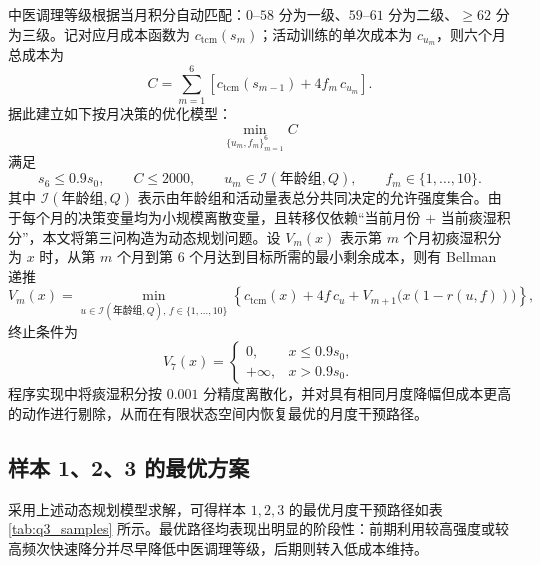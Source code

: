 \documentclass{MathorCupmodeling}
\begin{document}
		中医调理等级根据当月积分自动匹配：$0$--$58$ 分为一级、$59$--$61$ 分为二级、$\ge 62$ 分为三级。记对应月成本函数为 $c_{\text{tcm}}(s_m)$；活动训练的单次成本为 $c_{u_m}$，则六个月总成本为
		\begin{equation}
			C=\sum_{m=1}^{6}\left[c_{\text{tcm}}(s_{m-1})+4f_m\,c_{u_m}\right].
		\end{equation}
		据此建立如下按月决策的优化模型：
		\begin{equation}
			\min_{\{u_m,f_m\}_{m=1}^{6}} C
		\end{equation}
		满足
		\begin{equation}
			s_6\le 0.9s_0,\qquad C\le 2000,\qquad u_m\in\mathcal{I}(\text{年龄组},Q),\qquad f_m\in\{1,\dots,10\}.
		\end{equation}
		其中 $\mathcal{I}(\text{年龄组},Q)$ 表示由年龄组和活动量表总分共同决定的允许强度集合。由于每个月的决策变量均为小规模离散变量，且转移仅依赖“当前月份 + 当前痰湿积分”，本文将第三问构造为动态规划问题。设 $V_m(x)$ 表示第 $m$ 个月初痰湿积分为 $x$ 时，从第 $m$ 个月到第 $6$ 个月达到目标所需的最小剩余成本，则有 Bellman 递推
		\begin{equation}
			V_m(x)=\min_{u\in\mathcal{I}(\text{年龄组},Q),\,f\in\{1,\dots,10\}}
			\left\{
			c_{\text{tcm}}(x)+4f\,c_u+V_{m+1}\bigl(x(1-r(u,f))\bigr)
			\right\},
		\end{equation}
		终止条件为
		\begin{equation}
			V_7(x)=
			\begin{cases}
				0, & x\le 0.9s_0,\\
				+\infty, & x>0.9s_0.
			\end{cases}
		\end{equation}
		程序实现中将痰湿积分按 $0.001$ 分精度离散化，并对具有相同月度降幅但成本更高的动作进行剔除，从而在有限状态空间内恢复最优的月度干预路径。

	\subsection{样本 1、2、3 的最优方案}
		采用上述动态规划模型求解，可得样本 $1,2,3$ 的最优月度干预路径如表 \ref{tab:q3_samples} 所示。最优路径均表现出明显的阶段性：前期利用较高强度或较高频次快速降分并尽早降低中医调理等级，后期则转入低成本维持。
\end{document}
